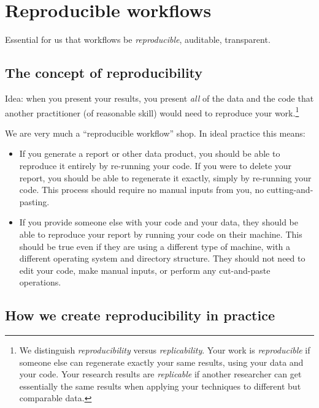 \documentclass[
]{book}
\begin{document}
\hypertarget{reproducible-workflows}{%
\section{Reproducible workflows}\label{reproducible-workflows}}

Essential for us that workflows be \emph{reproducible}, auditable, transparent.

\hypertarget{the-concept-of-reproducibility}{%
\subsection{The concept of reproducibility}\label{the-concept-of-reproducibility}}

Idea: when you present your results, you present \emph{all} of the data and the code that another practitioner (of reasonable skill) would need to reproduce your work.\footnote{We distinguish \emph{reproducibility} versus \emph{replicability}. Your work is \emph{reproducible} if someone else can regenerate exactly your same results, using your data and your code. Your research results are \emph{replicable} if another researcher can get essentially the same results when applying your techniques to different but comparable data.}

We are very much a ``reproducible workflow'' shop. In ideal practice this means:

\begin{itemize}
\item
  If you generate a report or other data product, you should be able to reproduce it entirely by re-running your code. If you were to delete your report, you should be able to regenerate it exactly, simply by re-running your code. This process should require no manual inputs from you, no cutting-and-pasting.
\item
  If you provide someone else with your code and your data, they should be able to reproduce your report by running your code on their machine. This should be true even if they are using a different type of machine, with a different operating system and directory structure. They should not need to edit your code, make manual inputs, or perform any cut-and-paste operations.
\end{itemize}

\hypertarget{how-we-create-reproducibility-in-practice}{%
\subsection{How we create reproducibility in practice}\label{how-we-create-reproducibility-in-practice}}
\end{document}
